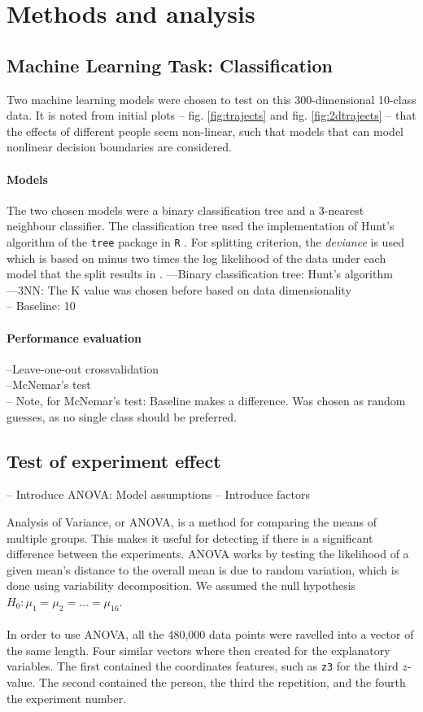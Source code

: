 \documentclass[12pt,fleqn]{article}
\begin{document}
\section{Methods and analysis}


\subsection{Machine Learning Task: Classification}
Two machine learning models were chosen to test on this 300-dimensional 10-class data.
It is noted from initial plots -- fig. \ref{fig:trajects} and fig. \ref{fig:2dtrajects} -- that the effects of different people seem non-linear, such that models that can model nonlinear decision boundaries are considered.
\paragraph{Models} The two chosen models were a binary classification tree and a 3-nearest neighbour classifier. The classification tree used the implementation of Hunt's algorithm of the \texttt{tree} package in \texttt{R} \cite{Tree}. For splitting criterion, the \textit{deviance} is used which is based on minus two times the log likelihood of the data under each model that the split results in \cite{Deviance}.
---Binary classification tree: Hunt's algorithm\\
---3NN: The K value was chosen before based on data dimensionality\\
-- Baseline: 10\pro\\  

\paragraph{Performance evaluation}
--Leave-one-out crossvalidation\\
--McNemar's test\\
-- Note, for McNemar's test: Baseline makes a difference. Was chosen as random guesses, as no single class should be preferred.
\subsection{Test of experiment effect}

-- Introduce ANOVA: Model assumptions
-- Introduce factors

Analysis of Variance, or ANOVA, is a method for comparing the means of multiple groups.
This makes it useful for detecting if there is a significant difference between the experiments.
ANOVA works by testing the likelihood of a given mean's distance to the overall mean is due to random variation, which is done using variability decomposition.
We assumed the null hypothesis $ H_0: \mu_1=\mu_2=\ldots=\mu_{16} $.\\
\\
In order to use ANOVA, all the 480,000 data points were ravelled into a vector of the same length.
Four similar vectors where then created for the explanatory variables.
The first contained the coordinates features, such as \texttt{z3} for the third $ z $-value.
The second contained the person, the third the repetition, and the fourth the experiment number.
\end{document}
